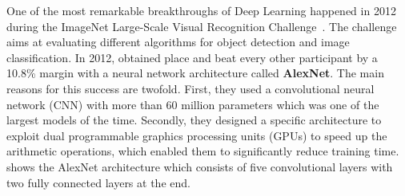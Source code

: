 One of the most remarkable breakthroughs of Deep Learning happened in 2012 during the ImageNet Large-Scale Visual Recognition Challenge~\cite{russakovsky2015imagenet}.
The challenge aims at evaluating different algorithms for object detection and image classification.
In 2012, \citeauthor{krizhevsky2012imagenet} obtained  place and beat every other participant by a 10.8\% margin with a neural network architecture called \textbf{AlexNet}.
The main reasons for this success are twofold.
First, they used a convolutional neural network (CNN) with more than 60 million parameters which was one of the largest models of the time.
Secondly, they designed a specific architecture to exploit dual programmable graphics processing units (GPUs) to speed up the arithmetic operations, which enabled them to significantly reduce training time.
 shows the AlexNet architecture which consists of five convolutional layers with two fully connected layers at the end.


